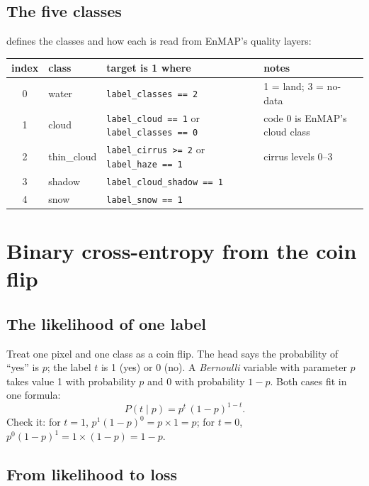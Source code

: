 \subsection{The five classes}

 defines the classes and how each is read from EnMAP's quality layers:
\begin{center}\small
\begin{tabular}{clll}
\toprule
index & class & target is 1 where & notes\\
\midrule
0 & water & \texttt{label\_classes == 2} & 1 = land; 3 = no-data\\
1 & cloud & \texttt{label\_cloud == 1} or \texttt{label\_classes == 0} & code 0 is EnMAP's cloud class\\
2 & thin\_cloud & \texttt{label\_cirrus >= 2} or \texttt{label\_haze == 1} & cirrus levels 0--3\\
3 & shadow & \texttt{label\_cloud\_shadow == 1} & \\
4 & snow & \texttt{label\_snow == 1} & \\
\bottomrule
\end{tabular}
\end{center}

\section{Binary cross-entropy from the coin flip}\label{sec:seghead:bce}

\subsection{The likelihood of one label}

Treat one pixel and one class as a coin flip. The head says the probability of ``yes'' is $p$; the label $t$ is 1 (yes) or 0 (no). A
\emph{Bernoulli} variable with parameter $p$ takes value 1 with probability $p$ and 0 with probability
$1 - p$. Both cases fit in one formula:
\begin{equation}\label{eq:seghead:bern}
  P(t \mid p) = p^{t}\,(1 - p)^{1 - t}.
\end{equation}
Check it: for $t = 1$, $p^1 (1-p)^0 = p \times 1 = p$; for $t = 0$, $p^0 (1-p)^1 = 1 \times (1 - p) = 1 - p$.

\subsection{From likelihood to loss}

